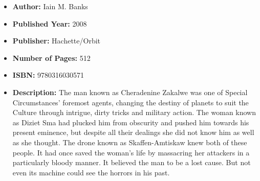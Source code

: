 \documentclass{tufte-handout}
\begin{document}
\begin{itemize}
    \item[] \textbf{Author:} Iain M. Banks
    \item[] \textbf{Published Year:} 2008 
    \item[] \textbf{Publisher:} Hachette/Orbit
    \item[] \textbf{Number of Pages:} 512      
    \item[] \textbf{ISBN:} 9780316030571
    \item[] \textbf{Description:} The man known as Cheradenine Zakalwe was one of Special Circumstances’ foremost agents, changing the destiny of planets to suit the Culture through intrigue, dirty tricks and military action. The woman known as Diziet Sma had plucked him from obscurity and pushed him towards his present eminence, but despite all their dealings she did not know him as well as she thought. The drone known as Skaffen-Amtiskaw knew both of these people. It had once saved the woman’s life by massacring her attackers in a particularly bloody manner. It believed the man to be a lost cause. But not even its machine could see the horrors in his past.
\end{itemize}
\end{document}
